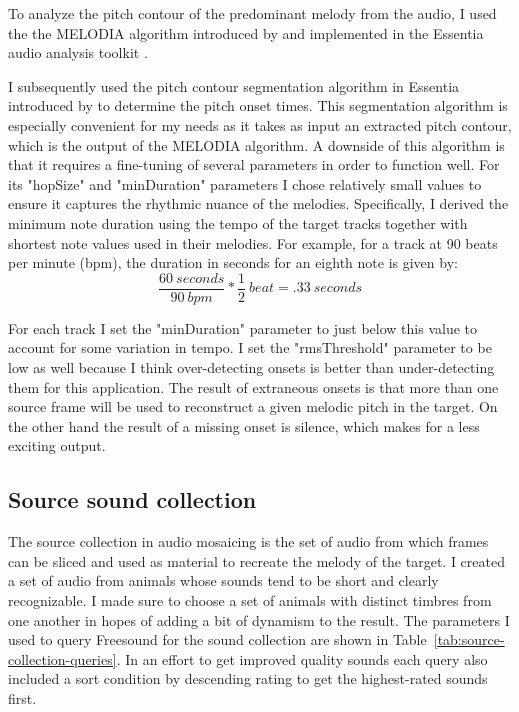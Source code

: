 \documentclass{article}
\begin{document}
To analyze the pitch contour of the predominant melody from the audio, I used the the MELODIA algorithm introduced by \citet{salamon2012melody} and implemented in the Essentia audio analysis toolkit \citep{bogdanov2013essentia}.

I subsequently used the pitch contour segmentation algorithm in Essentia introduced by \citet{mcnab1995signal} to determine the pitch onset times. This segmentation algorithm is especially convenient for my needs as it takes as input an extracted pitch contour, which is the output of the MELODIA algorithm. A downside of this algorithm is that it requires a fine-tuning of several parameters in order to function well. For its "hopSize" and "minDuration" parameters I chose relatively small values to ensure it captures the rhythmic nuance of the melodies. Specifically, I derived the minimum note duration using the tempo of the target tracks together with shortest note values used in their melodies. For example, for a track at 90 beats per minute (bpm), the duration in seconds for an eighth note is given by: \[\frac{60\ seconds}{90\ bpm} * \frac{1}{2}\ beat = .33\ seconds\]

For each track I set the "minDuration" parameter to just below this value to account for some variation in tempo. I set the "rmsThreshold" parameter to be low as well because I think over-detecting onsets is better than under-detecting them for this application. The result of extraneous onsets is that more than one source frame will be used to reconstruct a given melodic pitch in the target. On the other hand the result of a missing onset is silence, which makes for a less exciting output.


\subsection{Source sound collection}

The source collection in audio mosaicing is the set of audio from which frames can be sliced and used as material to recreate the melody of the target. I created a set of audio from animals whose sounds tend to be short and clearly recognizable. I made sure to choose a set of animals with distinct timbres from one another in hopes of adding a bit of dynamism to the result. The parameters I used to query Freesound for the sound collection are shown in Table~\ref{tab:source-collection-queries}. In an effort to get improved quality sounds each query also included a sort condition by descending rating to get the highest-rated sounds first.
\end{document}
